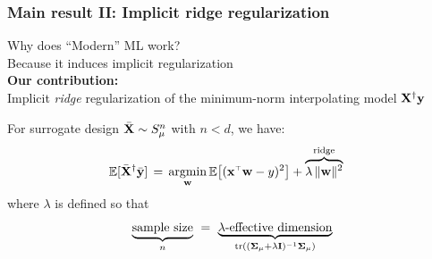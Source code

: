 \documentclass[8pt]{beamer}
\begin{document}
\begin{frame}
  \frametitle{Main result II: Implicit ridge regularization}
  Why does ``Modern'' ML work?\\
  Because it induces implicit regularization
  \\[10mm]

   \textbf{Our contribution:}\\
  Implicit \textit{ridge} regularization of the
  minimum-norm interpolating model $\mathbf X^\dagger\mathbf y$
  \vspace{5mm}

  \begin{theorem}
For surrogate design ${\bar{\mathbf X}}\sim S_{\mu}^n$ with $n<d$, we have:
    \vspace{-4mm}
    \begin{align*}
    \E[\Xb^\dagger\ybb]
     & \,=\,
    \argmin_\w\E\big[(\x^\top\w-y)^2\big] + \overbrace{\lambda
    \,\|\w\|^2}^{\text{ridge}}               
  \end{align*}
  where $\lambda$ is defined so that
  \[\underbrace{\text{sample size}}_{n}
    \ =\ \underbrace{\text{$\lambda$-effective dimension}}_{\mathrm{tr}((\mathbf{\Sigma}_\mu+\lambda\mathbf I)^{-1}\mathbf{\Sigma}_\mu)}\]
\end{theorem}
  

\end{frame}
\end{document}
